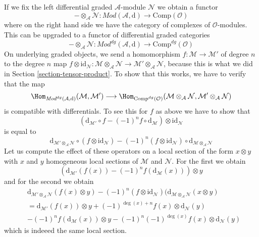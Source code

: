 \medskip\noindent
If we fix the left differential graded $\mathcal{A}$-module $\mathcal{N}$
we obtain a functor
$$
- \otimes_\mathcal{A} \mathcal{N} :
\textit{Mod}(\mathcal{A}, \text{d})
\longrightarrow
\text{Comp}(\mathcal{O})
$$
where on the right hand side we have the category of complexes of
$\mathcal{O}$-modules. This can be upgraded to a functor of
differential graded categories
$$
- \otimes_\mathcal{A} \mathcal{N} :
\textit{Mod}^{dg}(\mathcal{A}, \text{d})
\longrightarrow
\text{Comp}^{dg}(\mathcal{O})
$$
On underlying graded objects, we send
a homomorphism $f : \mathcal{M} \to \mathcal{M}'$ of degree $n$ 
to the degree $n$ map
$f \otimes \text{id}_\mathcal{N} :
\mathcal{M} \otimes_\mathcal{A} \mathcal{N} \to
\mathcal{M}' \otimes_\mathcal{A} \mathcal{N}$, because
this is what we did in Section \ref{section-tensor-product}.
To show that this works, we have to verify that the map
$$
\Hom_{\textit{Mod}^{dg}(\mathcal{A}, \text{d})}(\mathcal{M}, \mathcal{M}')
\longrightarrow
\Hom_{\text{Comp}^{dg}(\mathcal{O})}(
\mathcal{M} \otimes_\mathcal{A} \mathcal{N},
\mathcal{M}' \otimes_\mathcal{A} \mathcal{N})
$$
is compatible with differentials. To see this for $f$ as above
we have to show that
$$
(\text{d}_{\mathcal{M}'} \circ f - (-1)^n f \circ \text{d}_\mathcal{M})
\otimes \text{id}_\mathcal{N}
$$
is equal to
$$
\text{d}_{\mathcal{M}' \otimes_\mathcal{A} \mathcal{N}}
\circ (f \otimes \text{id}_\mathcal{N})
- (-1)^n (f \otimes \text{id}_\mathcal{N}) \circ
\text{d}_{\mathcal{M} \otimes_\mathcal{A} \mathcal{N}}
$$
Let us compute the effect of these operators on a local section
of the form $x \otimes y$ with $x$ and $y$ homogeneous local sections
of $\mathcal{M}$ and $\mathcal{N}$. For the first we obtain
$$
(\text{d}_{\mathcal{M}'}(f(x)) - (-1)^n f(\text{d}_\mathcal{M}(x))) \otimes y
$$
and for the second we obtain
\begin{align*}
&\text{d}_{\mathcal{M}' \otimes_\mathcal{A} \mathcal{N}}(f(x) \otimes y)
- (-1)^n (f \otimes \text{id}_\mathcal{N})(
\text{d}_{\mathcal{M} \otimes_\mathcal{A} \mathcal{N}}(x \otimes y) \\
& =
\text{d}_{\mathcal{M}'}(f(x)) \otimes y +
(-1)^{\deg(x) + n}f(x) \otimes \text{d}_\mathcal{N}(y) \\
&
-(-1)^n f(\text{d}_\mathcal{M}(x)) \otimes y
-(-1)^n (-1)^{\deg(x)}f(x) \otimes \text{d}_\mathcal{N}(y)
\end{align*}
which is indeeed the same local section.










